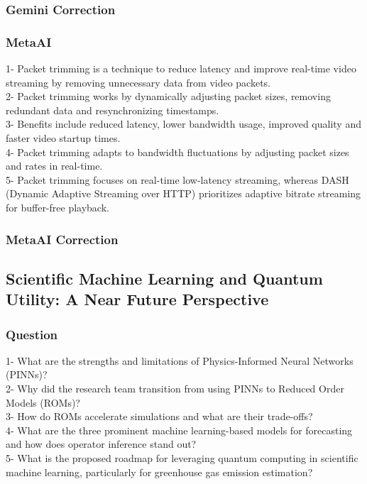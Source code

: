 \subsubsection{Gemini Correction}
\begin{tcolorbox}[breakable]
    
\end{tcolorbox}
\subsubsection{MetaAI}
\begin{tcolorbox}[breakable]
1- Packet trimming is a technique to reduce latency and improve real-time video streaming by removing unnecessary data from video packets.\\
2- Packet trimming works by dynamically adjusting packet sizes, removing redundant data and resynchronizing timestamps.\\
3- Benefits include reduced latency, lower bandwidth usage, improved quality and faster video startup times.\\
4- Packet trimming adapts to bandwidth fluctuations by adjusting packet sizes and rates in real-time.\\
5- Packet trimming focuses on real-time low-latency streaming, whereas DASH (Dynamic Adaptive Streaming over HTTP) prioritizes adaptive bitrate streaming for buffer-free playback.\\
\end{tcolorbox}
\subsubsection{MetaAI Correction}
\begin{tcolorbox}[breakable]
    
\end{tcolorbox}


\subsection{Scientific Machine Learning and Quantum Utility: A Near Future Perspective}
\subsubsection{Question}
\begin{tcolorbox}[breakable]
    1- What are the strengths and limitations of Physics-Informed Neural Networks (PINNs)?\\
2- Why did the research team transition from using PINNs to Reduced Order Models (ROMs)?\\
3- How do ROMs accelerate simulations and what are their trade-offs?\\
4- What are the three prominent machine learning-based models for forecasting and how does operator inference stand out?\\
5- What is the proposed roadmap for leveraging quantum computing in scientific machine learning, particularly for greenhouse gas emission estimation?\\

\end{tcolorbox}
